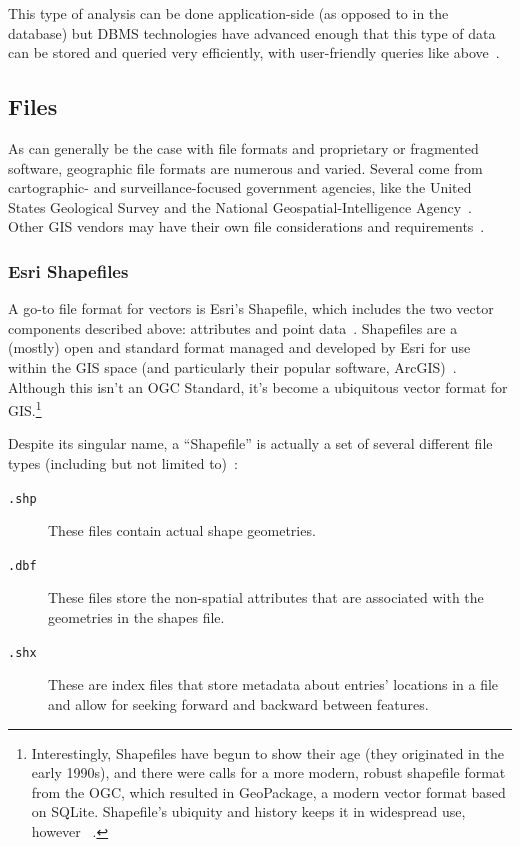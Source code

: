 This type of analysis can be done application-side (as opposed to in the database) but DBMS technologies have advanced enough that this type of data can be stored and queried very efficiently, with user-friendly queries like above~\cite{Boundless}.

\subsection{Files}
\label{background_formats}
As can generally be the case with file formats and proprietary or fragmented software, geographic file formats are numerous and varied. Several come from cartographic- and surveillance-focused government agencies, like the United States Geological Survey and the National Geospatial-Intelligence Agency~\cite{UsgsStandards}. Other GIS vendors may have their own file considerations and requirements~\cite{slashgeo,Environ1998,GeoJSON}.

\subsubsection{Esri Shapefiles}
A go-to file format for vectors is Esri's Shapefile, which includes the two vector components described above: attributes and point data~\cite{Environ1998}. Shapefiles are a (mostly) open and standard format managed and developed by Esri for use within the GIS space (and particularly their popular software, ArcGIS)~\cite{Environ1998}. Although this isn't an OGC Standard, it's become a ubiquitous vector format for GIS.\footnote{Interestingly, Shapefiles have begun to show their age (they originated in the early 1990s), and there were calls for a more modern, robust shapefile format from the OGC, which resulted in GeoPackage, a modern vector format based on SQLite. Shapefile's ubiquity and history keeps it in widespread use, however ~\cite{slashgeo,GeoPackage}.}

Despite its singular name, a ``Shapefile'' is actually a set of several different file types (including but not limited to)~\cite{Environ1998}:

\begin{description}
  \item[\tt{.shp}] These files contain actual shape geometries.
  \item[\tt{.dbf}] These files store the non-spatial attributes that are associated with the geometries in the shapes file.
  \item[\tt{.shx}] These are index files that store metadata about entries' locations in a file and allow for seeking forward and backward between features.
\end{description}

